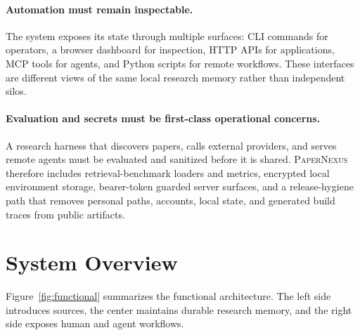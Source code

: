 \documentclass[11pt]{article}
\newcommand{\papernexus}{\textsc{PaperNexus}}
\newcommand{\mcp}{\textsc{MCP}}
\begin{document}
\paragraph{Automation must remain inspectable.}
The system exposes its state through multiple surfaces: CLI commands for operators, a browser dashboard for inspection, HTTP APIs for applications, \mcp{} tools for agents, and Python scripts for remote workflows. These interfaces are different views of the same local research memory rather than independent silos.

\paragraph{Evaluation and secrets must be first-class operational concerns.}
A research harness that discovers papers, calls external providers, and serves remote agents must be evaluated and sanitized before it is shared. \papernexus{} therefore includes retrieval-benchmark loaders and metrics, encrypted local environment storage, bearer-token guarded server surfaces, and a release-hygiene path that removes personal paths, accounts, local state, and generated build traces from public artifacts.

\section{System Overview}

Figure~\ref{fig:functional} summarizes the functional architecture. The left side introduces sources, the center maintains durable research memory, and the right side exposes human and agent workflows.
\end{document}
